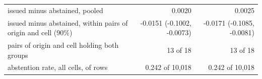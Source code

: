 \begin{tabular}{lrr}
issued minus abstained, pooled & 0.0020 & 0.0025 \\
issued minus abstained, within pairs of origin and cell (90\%) & -0.0151 (-0.1002, -0.0073) & -0.0171 (-0.1085, -0.0081) \\
pairs of origin and cell holding both groups & 13 of 18 & 13 of 18 \\
\midrule
abstention rate, all cells, of rows & 0.242 of 10,018 & 0.242 of 10,018 \\

\end{tabular}
